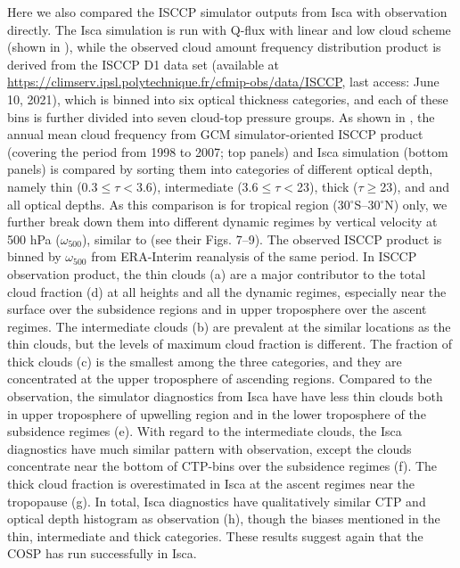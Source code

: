 Here we also compared the ISCCP simulator outputs from Isca with observation directly. The Isca simulation is run with Q-flux with linear and low cloud scheme (shown in ), while the observed cloud amount frequency distribution product is derived from the ISCCP D1 data set \citep{Rossow1999advances} (available at \url{https://climserv.ipsl.polytechnique.fr/cfmip-obs/data/ISCCP}, last access: June 10, 2021), which is binned into six optical thickness categories, and each of these bins is further divided into seven cloud-top pressure groups. As shown in , 
the annual mean cloud frequency from  GCM simulator-oriented ISCCP product (covering the period from 1998 to 2007; top panels) and Isca simulation (bottom panels) is compared by sorting them into categories of different optical depth, namely thin (0.3$\le\tau<$3.6), intermediate (3.6$\le\tau<$23), thick ($\tau\ge$23), and and all optical depths. As this comparison is for tropical region (30$^\circ$S--30$^\circ$N) only, we further break down them into different dynamic regimes by vertical velocity at 500 hPa ($\omega_{500}$), similar to \cite{Wyant2006comparison} (see their Figs. 7--9). The observed ISCCP product is binned by $\omega_{500}$ from ERA-Interim reanalysis of the same period. In ISCCP observation product, the thin clouds (a) are a major contributor to the total cloud fraction (d) at all heights and all the dynamic regimes, especially near the surface over the subsidence regions and in upper troposphere over the ascent regimes. The intermediate clouds (b) are prevalent at the similar locations as the thin clouds, but the levels of maximum cloud fraction is different. The fraction of thick clouds (c) is the smallest among the three categories, and they are concentrated at the upper troposphere of ascending regions. Compared to the observation, the simulator diagnostics from Isca have have less thin clouds both in upper troposphere of upwelling region and in the lower troposphere of the subsidence regimes (e). With regard to the intermediate clouds, the Isca diagnostics have much similar pattern with observation, except the clouds concentrate near the bottom of CTP-bins over the subsidence regimes (f). The thick cloud fraction is overestimated in Isca at the ascent regimes near the tropopause (g). In total, Isca diagnostics have qualitatively similar CTP and optical depth histogram as observation (h), though the biases mentioned in the thin, intermediate and thick categories. These results suggest again that the COSP has run successfully in Isca. 


